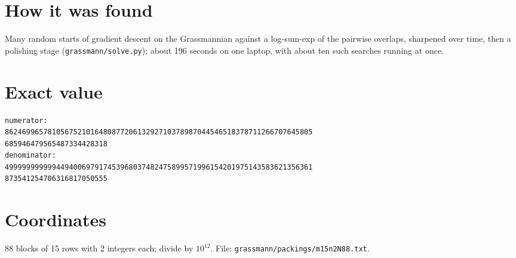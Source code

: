 \documentclass[11pt,a4paper]{article}
\begin{document}
\section{How it was found}
Many random starts of gradient descent on the Grassmannian against a log-sum-exp of the pairwise overlaps, sharpened over time, then a polishing stage (\texttt{grassmann/solve.py}); about 196 seconds on one laptop, with about ten such searches running at once.


\appendix
\section{Exact value}
{\small
\begin{verbatim}
numerator:
862469965781056752101648087720613292710378987044546518378711266707645805
685946479565487334428318
denominator:
499999999999449400697917453968037482475899571996154201975143583621356361
873541254706316817050555
\end{verbatim}}

\section{Coordinates}
88 blocks of 15 rows with 2 integers each; divide by $10^{12}$. File: \texttt{grassmann/packings/m15n2N88.txt}.
{\tiny
\begin{multicols}{4}
\end{multicols}}
\end{document}
